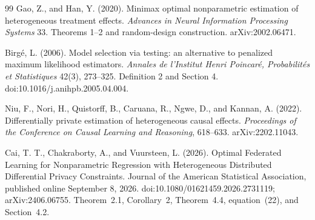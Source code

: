\documentclass{article}
\begin{document}
\begin{thebibliography}{99}
   Gao, Z., and Han, Y. (2020). Minimax optimal nonparametric estimation of heterogeneous treatment effects. \emph{Advances in Neural Information Processing Systems} 33. Theorems 1--2 and random-design construction. arXiv:2002.06471.

   Birgé, L. (2006). Model selection via testing: an alternative to penalized maximum likelihood estimators. \emph{Annales de l'Institut Henri Poincaré, Probabilités et Statistiques} 42(3), 273--325. Definition 2 and Section 4. doi:10.1016/j.anihpb.2005.04.004.

   Niu, F., Nori, H., Quistorff, B., Caruana, R., Ngwe, D., and Kannan, A. (2022). Differentially private estimation of heterogeneous causal effects. \emph{Proceedings of the Conference on Causal Learning and Reasoning}, 618--633. arXiv:2202.11043.

   Cai, T. T., Chakraborty, A., and Vuursteen, L. (2026). Optimal Federated Learning for Nonparametric Regression with Heterogeneous Distributed Differential Privacy Constraints. Journal of the American Statistical Association, published online September 8, 2026. doi:10.1080/01621459.2026.2731119; arXiv:2406.06755. Theorem~2.1, Corollary~2, Theorem~4.4, equation~(22), and Section~4.2.

\end{thebibliography}
\end{document}
